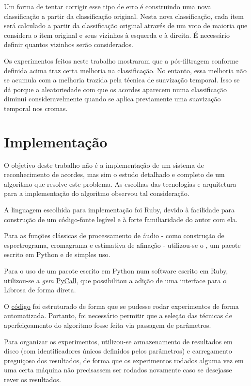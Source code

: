         Um forma de tentar corrigir esse tipo de erro é construindo uma nova classificação a partir da classificação original. Nesta nova classificação, cada item será calculado a partir da classificação original através de um voto de maioria que considera o item original e seus vizinhos à esquerda e à direita. É necessário definir quantos vizinhos serão considerados.
        
        Os experimentos feitos neste trabalho mostraram que a pós-filtragem conforme definida acima traz certa melhoria na classificação. No entanto, essa melhoria não se acumula com a melhoria trazida pela técnica de suavização temporal. Isso se dá porque a aleatoriedade com que os acordes aparecem numa classificação diminui consideravelmente quando se aplica previamente uma suavização temporal nos cromas.

\section{Implementação}
\label{sec:implementacao} 
    O objetivo deste trabalho não é a implementação de um sistema de reconhecimento de acordes, mas sim o estudo detalhado e completo de um algoritmo que resolve este problema. As escolhas das tecnologias e arquitetura para a implementação do algoritmo observou tal consideração.
    
    A linguagem escolhida para implementação foi Ruby, devido à facilidade para construção de um código-fonte legível e à forte familiaridade do autor com ela.
    
    Para as funções clássicas de processamento de áudio - como construção de espectrograma, cromagrama e estimativa de afinação - utilizou-se o \cite{librosa}, um pacote escrito em Python e de simples uso.

    Para o uso de um pacote escrito em Python num software escrito em Ruby, utilizou-se a \textit{gem} \href{https://rubygems.org/gems/pycall/versions/1.0.3}{PyCall}, que possibilitou a adição de uma interface para o Librosa de forma direta.
    
    O \href{https://github.com/gutomotta/chors}{código} foi estruturado de forma que se pudesse rodar experimentos de forma automatizada. Portanto, foi necessário permitir que a seleção das técnicas de aperfeiçoamento do algoritmo fosse feita via passagem de parâmetros.
    
    Para organizar os experimentos, utilizou-se armazenamento de resultados em disco (com identificadores únicos definidos pelos parâmetros) e carregamento preguiçoso dos resultados, de forma que os experimentos rodados alguma vez em uma certa máquina não precisassem ser rodados novamente caso se desejasse rever os resultados.
    
